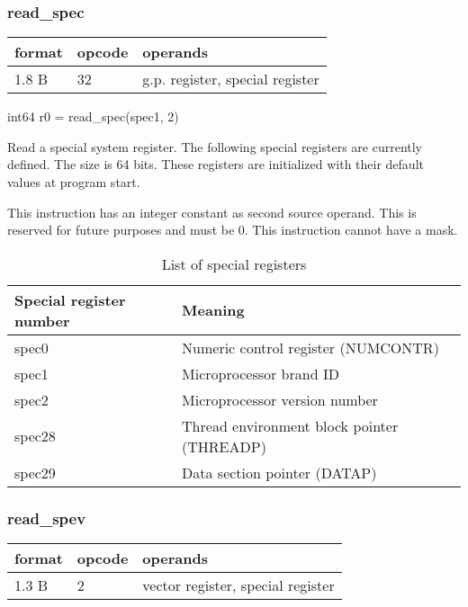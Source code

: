 \documentclass[forwardcom.tex]{subfiles}
\begin{document}
\subsubsection{read\_spec}
\label{table:readSpecInstruction}
\begin{tabular}{|p{12mm}|p{12mm}|p{110mm}|}
\hline
\bfseries format & \bfseries opcode & \bfseries operands \\ \hline
1.8 B & 32 & g.p. register, special register \\ \hline
\end{tabular}
\vspace{2mm}

int64 r0 = read\_spec(spec1, 2) \\
\vspace{2mm}

Read a special system register. The following special registers are currently defined. The size is 64 bits. These registers are initialized with their default values at program start.
\vspace{2mm}

This instruction has an integer constant as second source operand. This is reserved for future purposes and must be 0. This instruction cannot have a mask.

\begin{longtable} {|p{15mm}|p{100mm}|}
\caption{List of special registers} 
\label{table:specialRegisters} \\
\endfirsthead
\endhead
\hline
\bfseries Special register number & \bfseries Meaning  \\
\hline
spec0  & Numeric control register (NUMCONTR)  \\
spec1  & Microprocessor brand ID  \\
spec2  & Microprocessor version number   \\
spec28 & Thread environment block pointer (THREADP)   \\
spec29 & Data section pointer (DATAP)  \\
\hline
\end{longtable}

\subsubsection{read\_spev}
\label{table:readSpevInstruction}
\begin{tabular}{|p{12mm}|p{12mm}|p{110mm}|}
\hline
\bfseries format & \bfseries opcode & \bfseries operands \\ \hline
1.3 B & 2 & vector register, special register \\ \hline
\end{tabular}
\vspace{2mm}
\end{document}
